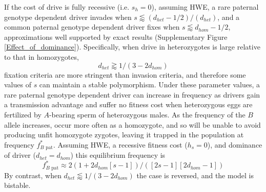 \documentclass[12pt,letterpaper]{article}
\begin{document}
If the cost of drive is fully recessive (i.e. $s_h=0$), assuming HWE, 
	a rare paternal genotype dependent driver invades when 
	$s\lessapprox (d_{het}-1/2)/(d_{het})$, and a common paternal genotype dependent driver fixes when 
	$s\lessapprox d_{hom}-1/2$, approximations well supported by exact results (Supplementary Figure \ref{Effect_of_dominance}).
Specifically, when drive in heterozygotes is large relative to that in homozygotes, 
	\begin{equation} d_{het}  \gtrapprox 1/(3-2d_{hom}) \label{polymale} \end{equation}
	fixation criteria are more stringent than invasion criteria, 
	and therefore some values of $s$ can maintain a stable polymorphism. 
Under these parameter values, a rare paternal genotype dependent driver 
	can increase in frequency as drivers gain a transmission advantage and suffer 
	no fitness cost when heterozygous eggs are fertilized by 
	$A$-bearing sperm of heterozygous males. 
As the frequency of the $B$ allele increases, 
	occur more often as a homozygote, and so will be unable to 
	avoid producing unfit homozygote zygotes, leaving it trapped in
	the population at frequency $f_{B\text{ pat}}^*$. 
Assuming HWE, a recessive fitness cost ($h_s=0$), and dominance of driver ($d_{het}=d_{hom}$) this equilibrium frequency is
\begin{equation}f_{B\text{ pat}}^*\approx2 (1 + 2d_{hom}[s - 1])/([2 s - 1][2d_{hom}- 1]) \label{eqmale} \end{equation}
By contrast, when $d_{het} \lessapprox 1/(3-2d_{hom})$ the case is reversed, and the model is bistable.
\end{document}
